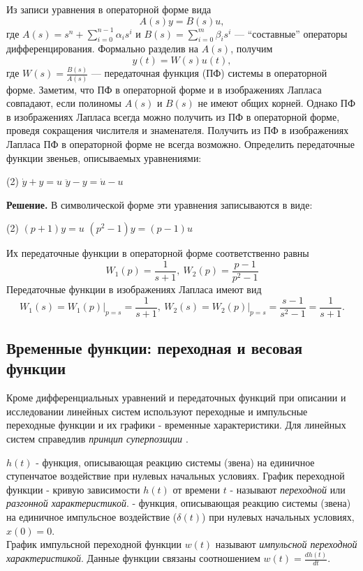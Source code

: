 \documentclass[../../TAU.tex]{subfiles}
\begin{document}
    Из записи уравнения  в операторной форме вида
    \begin{equation}\label{EQ_ODU_SYM_1}
        A(s)y = B(s)u,
    \end{equation}
    где 
    $A(s) = s^n + \sum_{i=0}^{n-1}\alpha_is^i$ и 
    $B(s) = \sum_{i=0}^{m}\beta_is^i$ --- ``составные'' операторы дифференцирования.
    Формально разделив  на $A(s)$, получим
    \begin{equation}
        y(t) = W(s)u(t),
    \end{equation}
    где 
    $W(s) = \frac{B(s)}{A(s)}$ --- передаточная функция (ПФ) системы  в операторной форме.
    Заметим, что ПФ в операторной форме и в изображениях Лапласа совпадают, если полиномы $A(s)$ и $B(s)$ не имеют общих корней. Однако ПФ в изображениях Лапласа всегда можно получить из ПФ в операторной форме, проведя сокращения числителя и знаменателя. Получить из ПФ в изображениях Лапласа ПФ в операторной форме не всегда возможно.
    \examp Определить передаточные функции звеньев, описываемых уравнениями:
    \begin{tasks}(2)
        \task $\dot y + y = u$
        \task $\ddot y - y = \dot u - u$
    \end{tasks}
    {\bf Решение.}
    В символической форме эти уравнения записываются в виде:
    \begin{tasks}(2)
        \task $(p+1) y = u$
        \task $(p^2-1) y = (p-1) u$
    \end{tasks}
    Их передаточные функции в операторной форме соответственно равны
    $$
        W_1(p)=\frac{1}{s+1}, \ W_2(p)= \frac{p-1}{p^2-1}
    $$
    Передаточные функции в изображениях Лапласа имеют вид
    $$
        \left.W_1(s)=W_1(p)\right\vert_{p=s} = \frac{1}{s+1}, \ 
        \left.W_2(s)=W_2(p)\right\vert_{p=s} = \frac{s-1}{s^2-1} = \frac{1}{s+1}.
    $$

\subsection{Временные функции: переходная и весовая функции} 

    Кроме дифференциальных уравнений и передаточных функций при описании и исследовании линейных систем используют переходные и импульсные переходные функции и их графики - временные характеристики.
    Для линейных систем справедлив {\it принцип суперпозиции \cite[стр. 35]{kim:uch}}. 

     $h(t)$  - функция, описывающая реакцию системы (звена) на единичное ступенчатое воздействие при нулевых начальных условиях. 
    График переходной функции - кривую зависимости $h(t)$ от времени $t$ - называют {\it переходной} или {\it разгонной характеристикой}.
    \defi{\it Импульсная переходная (весовая) функция $w(t)$} - функция, описывающая реакцию системы (звена) на единичное импульсное воздействие ($\delta(t)$) при нулевых начальных условиях, $x(0) = 0$.\\ 
    График импульсной переходной функции $w(t)$ называют {\it импульсной переходной характеристикой}.
    Данные функции связаны соотношением $w(t) = \frac{dh(t)}{dt}$.
\end{document}

